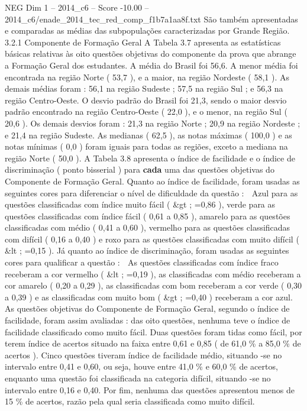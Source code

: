 \begin{textsample}{NEG Dim 1 – 2014\_c6 – Score -10.00 – 2014\_c6/enade\_2014\_tec\_red\_comp\_f1b7a1aa8f.txt}
São também apresentadas e comparadas as médias das subpopulações caracterizadas por Grande Região. 3.2.1 Componente de Formação Geral A Tabela 3.7 apresenta as estatísticas básicas relativas às oito questões objetivas do componente da prova que abrange a Formação Geral dos estudantes.
A média do Brasil foi 56,6.
A menor média foi encontrada na região Norte ( 53,7 ), e a maior, na região Nordeste ( 58,1 ).
As demais médias foram : 56,1 na região Sudeste ; 57,5 na região Sul ; e 56,3 na região Centro-Oeste.
O desvio padrão do Brasil foi 21,3, sendo o maior desvio padrão encontrado na região Centro-Oeste ( 22,0 ), e o menor, na região Sul ( 20,6 ).
Os demais desvios foram : 21,3 na região Norte ; 20,9 na região Nordeste ; e 21,4 na região Sudeste.
As medianas ( 62,5 ), as notas máximas ( 100,0 ) e as notas mínimas ( 0,0 ) foram iguais para todas as regiões, exceto a mediana na região Norte ( 50,0 ).
A Tabela 3.8 apresenta o índice de facilidade e o índice de discriminação ( ponto bisserial ) para \textbf{cada} uma das questões objetivas do Componente de Formação Geral.
Quanto ao índice de facilidade, foram usadas as seguintes cores para diferenciar o nível de dificuldade da questão :  Azul para as questões classificadas com índice muito fácil ( \&gt ; =0,86 ), verde para as questões classificadas com índice fácil ( 0,61 a 0,85 ), amarelo para as questões classificadas com médio ( 0,41 a 0,60 ), vermelho para as questões classificadas com difícil ( 0,16 a 0,40 ) e roxo para as questões classificadas com muito difícil ( \&lt ; =0,15 ).
Já quanto ao índice de discriminação, foram usadas as seguintes cores para qualificar a questão :  As questões classificadas com índice fraco receberam a cor vermelho ( \&lt ; =0,19 ), as classificadas com médio receberam a cor amarelo ( 0,20 a 0,29 ), as classificadas com bom receberam a cor verde ( 0,30 a 0,39 ) e as classificadas com muito bom ( \&gt ; =0,40 ) receberam a cor azul.
As questões objetivas do Componente de Formação Geral, segundo o índice de facilidade, foram assim avaliadas : das oito questões, nenhuma teve o índice de facilidade classificado como muito fácil.
Duas questões foram tidas como fácil, por terem índice de acertos situado na faixa entre 0,61 e 0,85 ( de 61,0 \% a 85,0 \% de acertos ).
Cinco questões tiveram índice de facilidade médio, situando -se no intervalo entre 0,41 e 0,60, ou seja, houve entre 41,0 \% e 60,0 \% de acertos, enquanto uma questão foi classificada na categoria difícil, situando -se no intervalo entre 0,16 e 0,40.
Por fim, nenhuma das questões apresentou menos de 15 \% de acertos, razão pela qual seria classificada como muito difícil.

\end{textsample}
